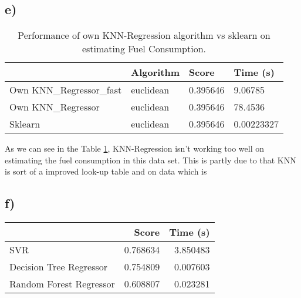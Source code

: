 \documentclass{article}
\begin{document}
        \subsection{e)}
          \begin{table}[h]
            \centering
            \label{tbl:task1e}
            \begin{tabular}{llll}
              \toprule
              {} &  Algorithm &     Score &    Time (s) \\
              \midrule
              Own KNN\_Regressor\_fast &  euclidean &  0.395646 &     9.06785 \\
              Own KNN\_Regressor      &  euclidean &  0.395646 &     78.4536 \\
              Sklearn                &  euclidean &  0.395646 &  0.00223327 \\
              \bottomrule
            \end{tabular}
            \caption{Performance of own KNN-Regression algorithm vs sklearn on estimating Fuel Consumption.}
          \end{table}
          As we can see in the Table \ref{tbl:task1e}, KNN-Regression isn't working too well on estimating the
          fuel consumption in this data set. This is partly due to that KNN is sort of a improved look-up table 
          and on data which is
        \subsection{f)}
          \begin{table}[h]
            \centering
            \label{tbl:task1f}
            \begin{tabular}{lrr}
              \toprule
              {} &     Score &  Time (s) \\
              \midrule
              SVR                     &  0.768634 &  3.850483 \\
              Decision Tree Regressor &  0.754809 &  0.007603 \\
              Random Forest Regressor &  0.608807 &  0.023281 \\
              \bottomrule
            \end{tabular}
          \end{table}
\end{document}

